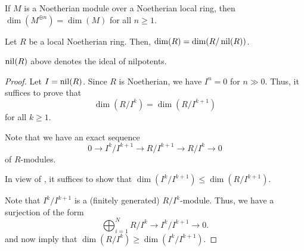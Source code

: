 \documentclass[12pt]{article}
\begin{document}
\begin{cor} \label{cor:dimension-direct-sum}
	If $M$ is a Noetherian module over a Noetherian local ring, then $\dim(M^{\oplus n}) = \dim(M)$ for all $n \ge 1$.
\end{cor}

\begin{thm}
	Let $R$ be a local Noetherian ring. Then, $\dim(R) = \dim(R/\operatorname{nil}(R))$.
\end{thm}
$\operatorname{nil}(R)$ above denotes the ideal of nilpotents.
\begin{proof} 
	Let $I = \operatorname{nil}(R)$. Since $R$ is Noetherian, we have $I^{n} = 0$ for $n \gg 0$. Thus, it suffices to prove that
	\begin{equation*} 
		\dim(R/I^{k}) = \dim(R/I^{k + 1})
	\end{equation*}
	for all $k \ge 1$.

	Note that we have an exact sequence
	\begin{equation*} 
		0 \to I^{k}/I^{k + 1} \to R/I^{k + 1} \to R/I^{k} \to 0
	\end{equation*}
	of $R$-modules.

	In view of , it suffices to show that $\dim(I^{k}/I^{k + 1}) \le \dim(R/I^{k + 1})$.

	Note that $I^{k}/I^{k + 1}$ is a (finitely generated) $R/I^{k}$-module. Thus, we have a surjection of the form
	\begin{equation*} 
		\bigoplus_{i = 1}^{N} R/I^{k} \to I^{k}/I^{k + 1} \to 0.
	\end{equation*}
	 and  now imply that $\dim(R/I^{k}) \ge \dim(I^{k}/I^{k + 1})$.
\end{proof}
\end{document}
